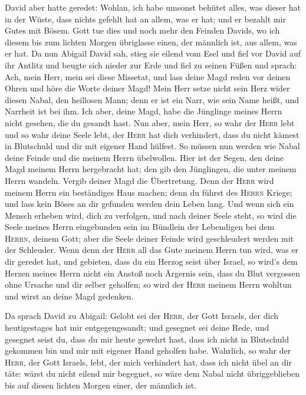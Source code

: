  David aber hatte geredet: Wohlan, ich habe umsonst
behütet alles, was dieser hat in der Wüste, dass nichts gefehlt hat an
allem, was er hat; und er bezahlt mir Gutes mit Bösem. 
Gott tue dies und noch mehr den Feinden Davids, wo ich diesem bis zum
lichten Morgen übriglasse einen, der männlich ist, aus allem, was er
hat.  Da nun Abigail David sah, stieg sie eilend vom Esel
und fiel vor David auf ihr Antlitz und beugte sich nieder zur Erde
 und fiel zu seinen Füßen und sprach: Ach, mein Herr,
mein sei diese Missetat, und lass deine Magd reden vor deinen Ohren und
höre die Worte deiner Magd!  Mein Herr setze nicht sein
Herz wider diesen Nabal, den heillosen Mann; denn er ist ein Narr, wie
sein Name heißt, und Narrheit ist bei ihm. Ich aber, deine Magd, habe
die Jünglinge meines Herrn nicht gesehen, die du gesandt hast.
 Nun aber, mein Herr, so wahr der \textsc{Herr} lebt und
so wahr deine Seele lebt, der \textsc{Herr} hat dich verhindert, dass du
nicht kämest in Blutschuld und dir mit eigener Hand hülfest. So müssen
nun werden wie Nabal deine Feinde und die meinem Herrn übelwollen.
 Hier ist der Segen, den deine Magd meinem Herrn
hergebracht hat; den gib den Jünglingen, die unter meinem Herrn wandeln.
 Vergib deiner Magd die Übertretung. Denn der
\textsc{Herr} wird meinem Herrn ein beständiges Haus machen; denn du
führst des \textsc{Herrn} Kriege; und lass kein Böses an dir gefunden
werden dein Leben lang.  Und wenn sich ein Mensch erheben
wird, dich zu verfolgen, und nach deiner Seele steht, so wird die Seele
meines Herrn eingebunden sein im Bündlein der Lebendigen bei dem
\textsc{Herrn}, deinem Gott; aber die Seele deiner Feinde wird
geschleudert werden mit der Schleuder.  Wenn denn der
\textsc{Herr} all das Gute meinem Herrn tun wird, was er dir geredet
hat, und gebieten, dass du ein Herzog seist über Israel, 
so wird's dem Herzen meines Herrn nicht ein Anstoß noch Ärgernis sein,
dass du Blut vergossen ohne Ursache und dir selber geholfen; so wird der
\textsc{Herr} meinem Herrn wohltun und wirst an deine Magd gedenken.

 Da sprach David zu Abigail: Gelobt sei der
\textsc{Herr}, der Gott Israels, der dich heutigestages hat mir
entgegengesandt;  und gesegnet sei deine Rede, und
gesegnet seist du, dass du mir heute gewehrt hast, dass ich nicht in
Blutschuld gekommen bin und mir mit eigener Hand geholfen habe.
 Wahrlich, so wahr der \textsc{Herr}, der Gott Israels,
lebt, der mich verhindert hat, dass ich nicht übel an dir täte: wärst du
nicht eilend mir begegnet, so wäre dem Nabal nicht übriggeblieben bis
auf diesen lichten Morgen einer, der männlich ist.

